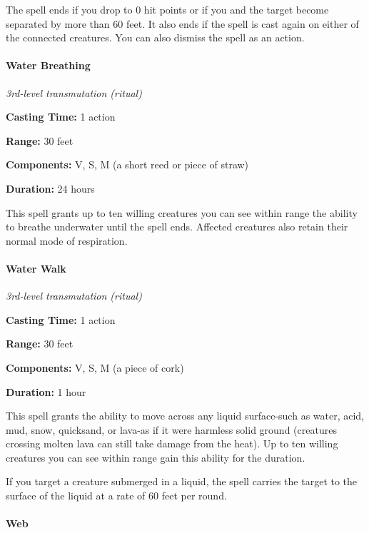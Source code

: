 \documentclass[
]{article}
\begin{document}
The spell ends if you drop to 0 hit points or if you and the target
become separated by more than 60 feet. It also ends if the spell is cast
again on either of the connected creatures. You can also dismiss the
spell as an action.

\hypertarget{water-breathing}{%
\paragraph{Water Breathing}\label{water-breathing}}

\emph{3rd-level transmutation (ritual)}

\textbf{Casting Time:} 1 action

\textbf{Range:} 30 feet

\textbf{Components:} V, S, M (a short reed or piece of straw)

\textbf{Duration:} 24 hours

This spell grants up to ten willing creatures you can see within range
the ability to breathe underwater until the spell ends. Affected
creatures also retain their normal mode of respiration.

\hypertarget{water-walk}{%
\paragraph{Water Walk}\label{water-walk}}

\emph{3rd-level transmutation (ritual)}

\textbf{Casting Time:} 1 action

\textbf{Range:} 30 feet

\textbf{Components:} V, S, M (a piece of cork)

\textbf{Duration:} 1 hour

This spell grants the ability to move across any liquid surface-such as
water, acid, mud, snow, quicksand, or lava-as if it were harmless solid
ground (creatures crossing molten lava can still take damage from the
heat). Up to ten willing creatures you can see within range gain this
ability for the duration.

If you target a creature submerged in a liquid, the spell carries the
target to the surface of the liquid at a rate of 60 feet per round.

\hypertarget{web}{%
\paragraph{Web}\label{web}}
\end{document}
